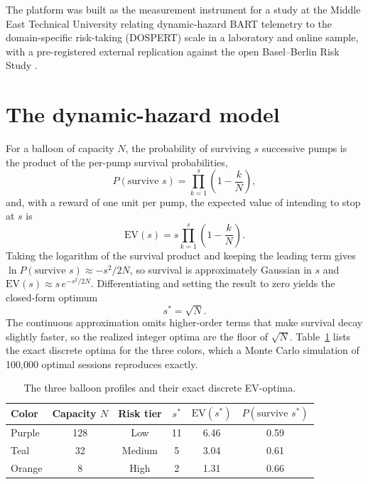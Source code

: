 \documentclass[11pt]{article}
\begin{document}
The platform was built as the measurement instrument for a study at the Middle
East Technical University relating dynamic-hazard BART telemetry to the
domain-specific risk-taking (DOSPERT) scale \citep{weber2002,blais2006} in a
laboratory and online sample, with a pre-registered external replication against
the open Basel--Berlin Risk Study \citep{frey2017}.

\section{The dynamic-hazard model}

For a balloon of capacity $N$, the probability of surviving $s$ successive pumps
is the product of the per-pump survival probabilities,
%
\begin{equation}
P(\text{survive } s) = \prod_{k=1}^{s}\left(1 - \frac{k}{N}\right),
\end{equation}
%
and, with a reward of one unit per pump, the expected value of intending to stop
at $s$ is
%
\begin{equation}
\mathrm{EV}(s) = s \prod_{k=1}^{s}\left(1 - \frac{k}{N}\right).
\end{equation}
%
Taking the logarithm of the survival product and keeping the leading term gives
$\ln P(\text{survive } s) \approx -s^2/2N$, so survival is approximately Gaussian
in $s$ and $\mathrm{EV}(s) \approx s\,e^{-s^2/2N}$. Differentiating and setting the
result to zero yields the closed-form optimum
%
\begin{equation}
s^* = \sqrt{N}.
\end{equation}
%
The continuous approximation omits higher-order terms that make survival decay
slightly faster, so the realized integer optima are the floor of $\sqrt{N}$.
Table~\ref{tab:optima} lists the exact discrete optima for the three colors, which
a Monte Carlo simulation of 100{,}000 optimal sessions reproduces exactly.

\begin{table}[t]
\centering
\caption{The three balloon profiles and their exact discrete EV-optima.}
\label{tab:optima}
\begin{tabular}{lccccc}
\toprule
Color & Capacity $N$ & Risk tier & $s^*$ & $\mathrm{EV}(s^*)$ & $P(\text{survive } s^*)$\\
\midrule
Purple & 128 & Low    & 11 & 6.46 & 0.59\\
Teal   & 32  & Medium & 5  & 3.04 & 0.61\\
Orange & 8   & High   & 2  & 1.31 & 0.66\\
\bottomrule
\end{tabular}
\end{table}
\end{document}
